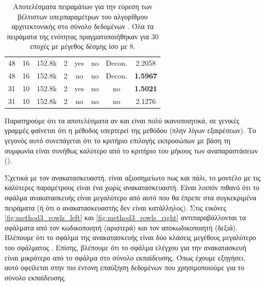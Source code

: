 \begin{table}[H]
\begin{center}
{\begin{tabular}{c c c c c c c c}
            48 & 16 & 152.8k & 2 & yes & no & Decon. & 2.2058 \\ %
            48 & 16 & 152.8k & 2 & no & no & Decon. & \textbf{1.5967}\\ %

            31 & 10 & 152.8k & 2 & yes & no & no & \textbf{1.5021}\\%
            31 & 10 & 152.8k & 2 & no & no & no & 2.1276\\%

            \bottomrule
        \end{tabular}
        }
    \end{center}
    \caption[]{\label{tab:method_3_hyper_tuning_RoWLS}Αποτελέσματα πειραμάτων για την εύρεση των βέλτιστων υπερπαραμέτρων του αλγορίθμου  αρχιτεκτονικής  στο σύνολο δεδομένων . Όλα τα πειράματα της ενότητας πραγματοποιήθηκαν για 30 εποχές με μέγεθος δέσμης ίσο με 8.} 
\end{table}
Παρατηρούμε ότι τα αποτελέσματα αν και είναι πολύ ικανοποιητικά, σε γενικές γραμμές φαίνεται ότι η μέθοδος  υπερτερεί της μεθόδου  (πλην λίγων εξαιρέσεων). Το γεγονός αυτό συνεπάγεται ότι το κριτήριο επιλογής εκπροσώπων με βάση τη συμφωνία είναι συνήθως καλύτερο από το κριτήριο του μήκους των αναπαραστάσεων ().\par

Σχετικά με τον ανακατασκευαστή, είναι αξιοσημείωτο πως και πάλι, το μοντέλο με τις καλύτερες παραμέτρους είναι ένα χωρίς ανακατασκευαστή. Είναι λοιπόν πιθανό ότι το σφάλμα ανακατασκευής είναι μεγαλύτερο από αυτό που θα έπρεπε στα συγκεκριμένα πειράματα (ή ότι ο ανακατασκευαστής δεν είναι κατάλληλος). Στις εικόνες \ref{fig:method3_rowls_left} και \ref{fig:method3_rowls_right} αντιπαραβάλλονται τα σφάλματα από τον κωδικοποιητή (αριστερά) και τον αποκωδικοποιητή (δεξιά). Βλέπουμε ότι το σφάλμα της ανακατασκευής είναι δύο κλάσεις μεγέθους μεγαλύτερο του σφάλματος . Επίσης, βλέπουμε ότι το σφάλμα ελέγχου για την ανακατασκευή είναι μικρότερο από το σφάλμα στο σύνολο εκπαίδευσης. Όπως έχουμε εξηγήσει, αυτό οφείλεται στην πιο έντονη επαύξηση δεδομένων που χρησιμοποιούμε για το σύνολο εκπαίδευσης.

